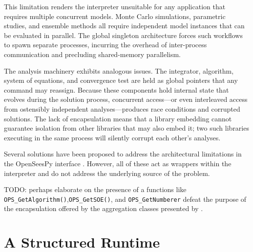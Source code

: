 This limitation renders the interpreter unsuitable for any application that requires multiple concurrent models. Monte Carlo simulations, parametric studies, and ensemble methods all require independent model instances that can be evaluated in parallel. 
The global singleton architecture forces such workflows to spawn separate processes, incurring the overhead of inter-process communication and precluding shared-memory parallelism.

The analysis machinery exhibits analogous issues. 
The integrator, algorithm, system of equations, and convergence test are held as global pointers that any command may reassign. 
Because these components hold internal state that evolves during the solution process, concurrent access---or even interleaved access from ostensibly independent analyses---produces race conditions and corrupted solutions. 
The lack of encapsulation means that a library embedding \OpenSees{} cannot guarantee isolation from other libraries that may also embed it; two such libraries executing in the same process will silently corrupt each other's analyses.


Several solutions have been proposed to address the architectural limitations in the OpenSeesPy interface \citep{marafi2022openseesapi,manousakis2022opensees,dong2022smartanalyze,talley2021opswrapper,cslotboom2021openseespytools,2022o3seespy}. 
However, all of these act as wrappers within the interpreter and do not address the underlying source of the problem.

\begin{Note}
    TODO: perhaps elaborate on the presence of a functions like \texttt{OPS\_GetAlgorithm()},\texttt{OPS\_GetSOE()}, and \texttt{OPS\_{GetNumberer}} defeat the purpose of the encapsulation offered by the aggregation classes presented by \cite{mckenna1997object}.
\end{Note}
\section{A Structured Runtime}\label{sec:runtime}

